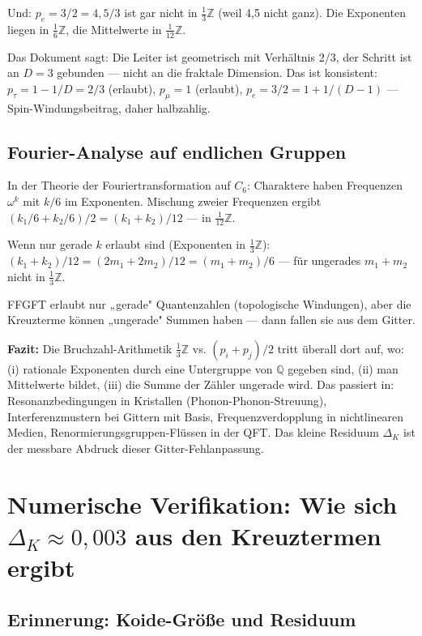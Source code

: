 Und: $p_e=3/2=4{,}5/3$ ist gar nicht in $\tfrac{1}{3}\mathbb{Z}$ (weil 4,5 nicht ganz).
Die Exponenten liegen in $\tfrac{1}{6}\mathbb{Z}$,
die Mittelwerte in $\tfrac{1}{12}\mathbb{Z}$.

Das Dokument sagt: Die Leiter ist geometrisch mit Verhältnis 2/3, der Schritt
ist an $D=3$ gebunden — nicht an die fraktale Dimension.
Das ist konsistent: $p_\tau=1-1/D=2/3$ (erlaubt),
$p_\mu=1$ (erlaubt), $p_e=3/2=1+1/(D-1)$ — Spin-Windungsbeitrag, daher halbzahlig.

\subsection{Fourier-Analyse auf endlichen Gruppen}

In der Theorie der Fouriertransformation auf $C_6$:
Charaktere haben Frequenzen $\omega^k$ mit $k/6$ im Exponenten.
Mischung zweier Frequenzen ergibt
$(k_1/6+k_2/6)/2=(k_1+k_2)/12$ — in $\tfrac{1}{12}\mathbb{Z}$.

Wenn nur gerade $k$ erlaubt sind (Exponenten in $\tfrac{1}{3}\mathbb{Z}$):
$(k_1+k_2)/12=(2m_1+2m_2)/12=(m_1+m_2)/6$ —
für ungerades $m_1+m_2$ nicht in $\tfrac{1}{3}\mathbb{Z}$.

FFGFT erlaubt nur „gerade" Quantenzahlen (topologische Windungen),
aber die Kreuzterme können „ungerade" Summen haben — dann fallen sie aus dem Gitter.

\medskip\noindent
\textbf{Fazit:} Die Bruchzahl-Arithmetik $\tfrac{1}{3}\mathbb{Z}$
vs. $(p_i+p_j)/2$ tritt überall dort auf, wo:
(i) rationale Exponenten durch eine Untergruppe von $\mathbb{Q}$ gegeben sind,
(ii) man Mittelwerte bildet,
(iii) die Summe der Zähler ungerade wird.
Das passiert in:
Resonanzbedingungen in Kristallen (Phonon-Phonon-Streuung),
Interferenzmustern bei Gittern mit Basis,
Frequenzverdopplung in nichtlinearen Medien,
Renormierungsgruppen-Flüssen in der QFT.
Das kleine Residuum $\Delta_K$ ist der messbare Abdruck dieser Gitter-Fehlanpassung.

\section{Numerische Verifikation: Wie sich \texorpdfstring{$\Delta_K\approx0{,}003$}{DeltaK} aus den Kreuztermen ergibt}


\subsection{Erinnerung: Koide-Größe und Residuum}

